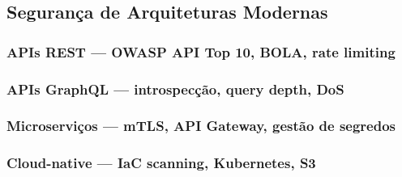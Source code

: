 {
\color{red}
\subsection{
    Segurança de Arquiteturas Modernas
}\label{sec:modern_architecture_security}

\subsubsection{
    APIs REST — OWASP API Top 10, BOLA, rate limiting
}\label{sec:apis_rest}

\lipsum[1-3]

\subsubsection{
    APIs GraphQL — introspecção, query depth, DoS
}\label{sec:apis_graphql}
\lipsum[4-6]

\subsubsection{
    Microserviços — mTLS, API Gateway, gestão de segredos
}\label{sec:microservices}
\lipsum[7-9]

\subsubsection{
    Cloud-native — IaC scanning, Kubernetes, S3
}\label{sec:cloud_native}
\lipsum[10-12]
}

